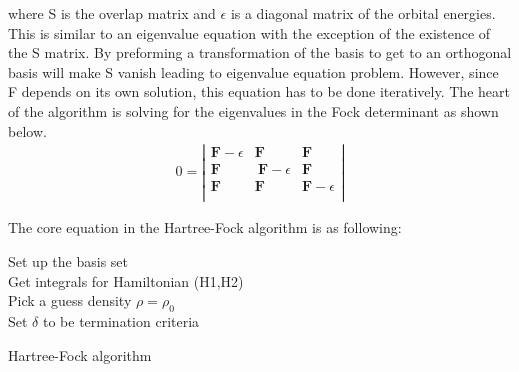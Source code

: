\documentclass[twoside]{article}
\begin{document}


where S is the overlap matrix and $\epsilon$ is a diagonal matrix of the orbital energies. This is similar to an eigenvalue equation with the exception of the existence of the S matrix. By preforming a transformation of the basis to get to an orthogonal basis will make S vanish leading to eigenvalue equation problem. However, since F depends on its own solution, this equation has to be done iteratively. The heart of the algorithm is solving for the eigenvalues in the Fock determinant as shown below.\\
\begin{eqnarray}
0 =
\left|
\begin{array}{ccc}
\textbf{F}-\epsilon &\textbf{F}&\textbf{F}\\
\textbf{F}&\ \textbf{F}-\epsilon &\textbf{F}\\
\textbf{F}&\textbf{F}&\textbf{F}-\epsilon \\
\end{array}
\right|
\end{eqnarray}


The core equation in the Hartree-Fock algorithm is as following: \\
\begin{algorithm}[htb]
 \KwData{ }
	Set up the basis set\\
	Get integrals for Hamiltonian (H1,H2)\\
	Pick a guess density $\rho = \rho_0$ \\
	Set $\delta$ to be termination criteria \\
 \caption{Hartree-Fock algorithm}
\end{algorithm}
 
\end{document}
